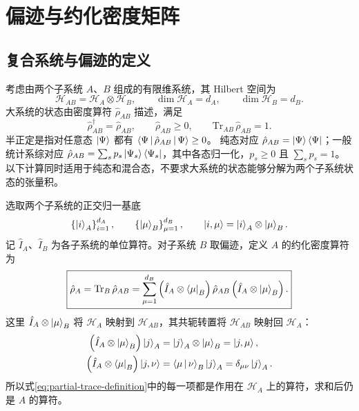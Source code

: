 \section{偏迹与约化密度矩阵}
\subsection{复合系统与偏迹的定义}
考虑由两个子系统 $A$、$B$ 组成的有限维系统，其 Hilbert 空间为
\begin{equation}
\mathcal H_{AB}=\mathcal H_A\otimes\mathcal H_B,
\qquad \dim\mathcal H_A=d_A,\qquad \dim\mathcal H_B=d_B.
\end{equation}
大系统的状态由密度算符 $\hat\rho_{AB}$ 描述，满足
\begin{equation}
\hat\rho_{AB}^\dagger=\hat\rho_{AB},\qquad
\hat\rho_{AB}\geq0,\qquad \mathrm{Tr}_{AB}\,\hat\rho_{AB}=1.
\end{equation}
半正定是指对任意态 $\Ket{\Psi}$ 都有 $\Braket{\Psi|\hat\rho_{AB}|\Psi}\geq0$。
纯态对应 $\hat\rho_{AB}=\Ket{\Psi}\Bra{\Psi}$；一般统计系综对应
$\hat\rho_{AB}=\sum_s p_s\Ket{\Psi_s}\Bra{\Psi_s}$，其中各态归一化，$p_s\geq0$ 且 $\sum_s p_s=1$。
以下计算同时适用于纯态和混合态，不要求大系统的状态能够分解为两个子系统状态的张量积。

选取两个子系统的正交归一基底
\begin{equation}
\left\{\Ket{i}_A\right\}_{i=1}^{d_A},\qquad
\left\{\Ket{\mu}_B\right\}_{\mu=1}^{d_B},\qquad
\Ket{i,\mu}=\Ket{i}_A\otimes\Ket{\mu}_B.
\end{equation}
记 $\hat I_A$、$\hat I_B$ 为各子系统的单位算符。对子系统 $B$ 取偏迹，定义 $A$ 的约化密度算符为
\begin{equation}
\boxed{\hat\rho_A=\mathrm{Tr}_B\,\hat\rho_{AB}
=\sum_{\mu=1}^{d_B}
\left(\hat I_A\otimes\Bra{\mu}_B\right)
\hat\rho_{AB}
\left(\hat I_A\otimes\Ket{\mu}_B\right).}
\label{eq:partial-trace-definition}
\end{equation}
这里 $\hat I_A\otimes\Ket{\mu}_B$ 将 $\mathcal H_A$ 映射到 $\mathcal H_{AB}$，其共轭转置将 $\mathcal H_{AB}$ 映射回 $\mathcal H_A$：
\begin{align}
\left(\hat I_A\otimes\Ket{\mu}_B\right)\Ket{j}_A
&=\Ket{j}_A\otimes\Ket{\mu}_B=\Ket{j,\mu},\\
\left(\hat I_A\otimes\Bra{\mu}_B\right)\Ket{j,\nu}
&=\Braket{\mu|\nu}_B\Ket{j}_A=\delta_{\mu\nu}\Ket{j}_A.
\end{align}
所以式\eqref{eq:partial-trace-definition}中的每一项都是作用在 $\mathcal H_A$ 上的算符，求和后仍是 $A$ 的算符。

